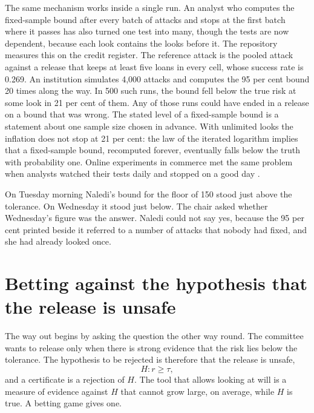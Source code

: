 The same mechanism works inside a single run. An analyst who computes the
fixed-sample bound after every batch of attacks and stops at the first batch where
it passes has also turned one test into many, though the tests are now dependent,
because each look contains the looks before it. The repository measures this on the
credit register. The reference attack is the pooled attack against a release that
keeps at least five loans in every cell, whose success rate is 0.269.
An institution simulates 4,000 attacks and computes the 95 per cent bound 20 times
along the way. In 500 such runs, the bound fell below the true risk at some look in
21 per cent of them. Any of those runs could have ended in a release on a bound that
was wrong.
The stated level of a fixed-sample bound is a statement about one sample size
chosen in advance. With unlimited looks the inflation does not stop at 21 per cent:
the law of the iterated logarithm implies that a fixed-sample bound, recomputed
forever, eventually falls below the truth with probability one. Online experiments
in commerce met the same problem when analysts watched their tests daily and
stopped on a good day \citep{johari2022}.

On Tuesday morning Naledi's bound for the floor of 150 stood just above the
tolerance. On Wednesday it stood just below. The chair asked whether Wednesday's
figure was the answer. Naledi could not say yes, because the 95 per cent printed
beside it referred to a number of attacks that nobody had fixed, and she had
already looked once.

\section{Betting against the hypothesis that the release is unsafe}\label{c06:sec-martingale}

The way out begins by asking the question the other way round. The committee wants
to release only when there is strong evidence that the risk lies below the
tolerance. The hypothesis to be rejected is therefore that the release is unsafe,
\[
H : r \ge \tau ,
\]
and a certificate is a rejection of $H$. The tool that allows looking at will is a
measure of evidence against $H$ that cannot grow large, on average, while $H$ is
true. A betting game gives one.

